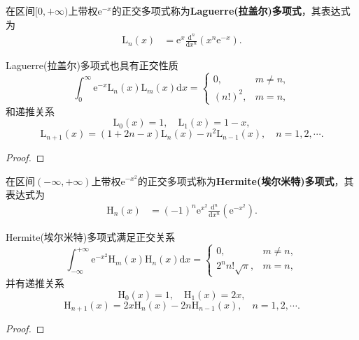 \documentclass[../../main.tex]{subfiles}
\begin{document}
\begin{definition}
在区间$[0,+\infty)$上带权$\mathrm{e}^{-x}$的正交多项式称为\textbf{Laguerre(拉盖尔)多项式}，其表达式为
\begin{align}\label{eq:数值分析-3-2.17}
\mathrm{L}_n(x) &= \mathrm{e}^x \frac{\mathrm{d}^n}{\mathrm{d}x^n}(x^n \mathrm{e}^{-x}).
\end{align}
\end{definition}

\begin{theorem}
Laguerre(拉盖尔)多项式也具有正交性质
$$\int_0^\infty \mathrm{e}^{-x}\mathrm{L}_n(x)\mathrm{L}_m(x)\mathrm{d}x =
\begin{cases}
0, & m \neq n, \\
(n!)^2, & m = n,
\end{cases}$$
和递推关系
$$\mathrm{L}_0(x) = 1,\quad \mathrm{L}_1(x) = 1 - x,$$
$$\mathrm{L}_{n+1}(x) = (1 + 2n - x)\mathrm{L}_n(x) - n^2\mathrm{L}_{n-1}(x),\quad n = 1,2,\cdots.$$
\end{theorem}
\begin{proof}


\end{proof}

\begin{definition}
在区间$(-\infty,+\infty)$上带权$\mathrm{e}^{-x^2}$的正交多项式称为\textbf{Hermite(埃尔米特)多项式}，其表达式为
\begin{align}\label{eq:数值分析-3-2.18}
\mathrm{H}_n(x) &= (-1)^n \mathrm{e}^{x^2} \frac{\mathrm{d}^n}{\mathrm{d}x^n}(\mathrm{e}^{-x^2}).
\end{align}
\end{definition}

\begin{theorem}
Hermite(埃尔米特)多项式满足正交关系
$$\int_{-\infty}^{+\infty} \mathrm{e}^{-x^2}\mathrm{H}_m(x)\mathrm{H}_n(x)\mathrm{d}x =
\begin{cases}
0, & m \neq n, \\
2^n n! \sqrt{\pi}, & m = n,
\end{cases}$$
并有递推关系
$$\mathrm{H}_0(x) = 1,\quad \mathrm{H}_1(x) = 2x,$$
$$\mathrm{H}_{n+1}(x) = 2x\mathrm{H}_n(x) - 2n\mathrm{H}_{n-1}(x),\quad n = 1,2,\cdots.$$
\end{theorem}
\begin{proof}


\end{proof}
\end{document}
